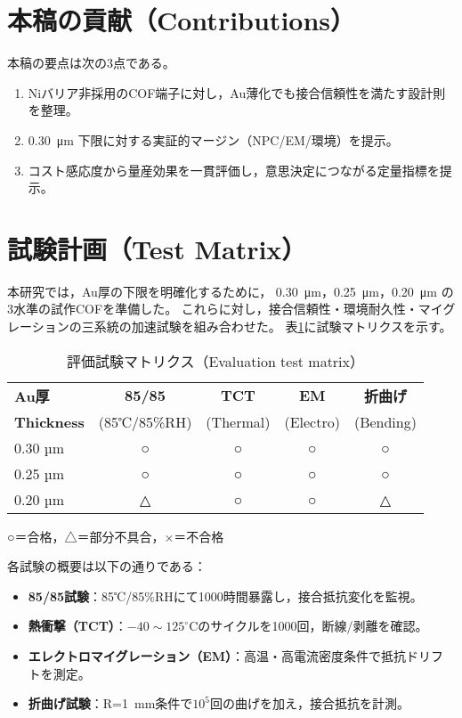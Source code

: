 \documentclass[conference]{IEEEtran}
\begin{document}
\section{本稿の貢献（Contributions）}
本稿の要点は次の3点である。
\begin{enumerate}
  \item Niバリア非採用のCOF端子に対し，Au薄化でも接合信頼性を満たす設計則を整理。
  \item \SI{0.30}{\micro\meter} 下限に対する実証的マージン（NPC/EM/環境）を提示。
  \item コスト感応度から量産効果を一貫評価し，意思決定につながる定量指標を提示。
\end{enumerate}

\section{試験計画（Test Matrix）}
本研究では，Au厚の下限を明確化するために，
\SI{0.30}{\micro\meter}，\SI{0.25}{\micro\meter}，\SI{0.20}{\micro\meter} の
3水準の試作COFを準備した。
これらに対し，接合信頼性・環境耐久性・マイグレーションの三系統の加速試験を組み合わせた。
表\ref{tab:test-matrix}に試験マトリクスを示す。

\begin{table}[htbp]
  \centering
  \caption{評価試験マトリクス（Evaluation test matrix）}
  \label{tab:test-matrix}
  \begin{tabular}{@{}lcccc@{}}
    \toprule
    \textbf{Au厚} & \textbf{85/85} & \textbf{TCT} & \textbf{EM} & \textbf{折曲げ} \\
    \textbf{Thickness} & (85℃/85\%RH) & (Thermal) & (Electro) & (Bending) \\
    \midrule
    0.30 µm & ○ & ○ & ○ & ○ \\
    0.25 µm & ○ & ○ & ○ & ○ \\
    0.20 µm & △ & ○ & ○ & △ \\
    \bottomrule
  \end{tabular}
  \vspace{2pt}
  \footnotesize{○＝合格，△＝部分不具合，×＝不合格}
\end{table}

各試験の概要は以下の通りである：
\begin{itemize}
  \item \textbf{85/85試験}：85℃/85\%RHにて1000時間暴露し，接合抵抗変化を監視。
  \item \textbf{熱衝撃（TCT）}：$-40\sim125^\circ$Cのサイクルを1000回，断線/剥離を確認。
  \item \textbf{エレクトロマイグレーション（EM）}：高温・高電流密度条件で抵抗ドリフトを測定。
  \item \textbf{折曲げ試験}：R=\SI{1}{mm}条件で$10^5$回の曲げを加え，接合抵抗を計測。
\end{itemize}
\end{document}
